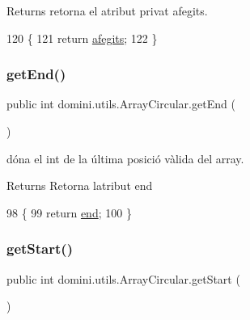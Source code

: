\begin{DoxyReturn}{Returns}
retorna el atribut privat afegits. 
\end{DoxyReturn}

\begin{DoxyCode}
120     \{
121         \textcolor{keywordflow}{return} \hyperlink{classdomini_1_1utils_1_1ArrayCircular_a08291d877b2d4c71c219df6f983b279a}{afegits};
122     \}
\end{DoxyCode}
\mbox{\label{classdomini_1_1utils_1_1ArrayCircular_a3fe38ed7aa9d3b4f99bc4c80cd72bb3e}} 
\subsubsection{\texorpdfstring{get\+End()}{getEnd()}}
{\footnotesize\ttfamily public int domini.\+utils.\+Array\+Circular.\+get\+End (\begin{DoxyParamCaption}{ }\end{DoxyParamCaption})\hspace{0.3cm}{\ttfamily [inline]}}



dóna el int de la última posició vàlida del array. 

\begin{DoxyReturn}{Returns}
Retorna l\textquotesingle{}atribut end 
\end{DoxyReturn}

\begin{DoxyCode}
98     \{
99         \textcolor{keywordflow}{return} \hyperlink{classdomini_1_1utils_1_1ArrayCircular_ad3f40ecb62a2503382fa5d1fa2025912}{end};
100     \}
\end{DoxyCode}
\mbox{\label{classdomini_1_1utils_1_1ArrayCircular_a3527e861f31137d21dd09e4fe452badd}} 
\subsubsection{\texorpdfstring{get\+Start()}{getStart()}}
{\footnotesize\ttfamily public int domini.\+utils.\+Array\+Circular.\+get\+Start (\begin{DoxyParamCaption}{ }\end{DoxyParamCaption})\hspace{0.3cm}{\ttfamily [inline]}}



